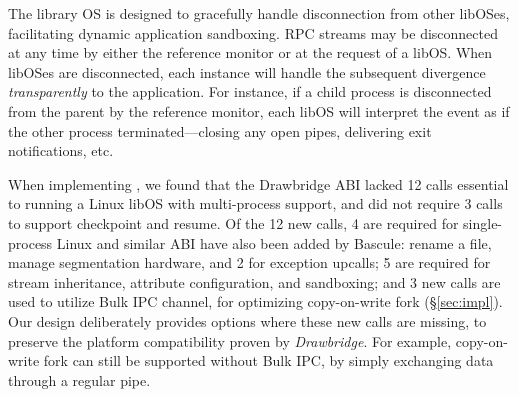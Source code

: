 The \sysname{} library OS is designed
to gracefully handle disconnection from other libOSes, 
facilitating dynamic application sandboxing.
RPC streams may be disconnected at any time by 
either the reference monitor or at the request of a libOS.
When \sysname{} libOSes are disconnected, each instance will handle the subsequent
divergence 
{\em transparently} to the application.
For instance, if a child process is disconnected from the parent by the reference monitor,
each libOS will interpret the event as if the other process terminated---closing any open pipes,
delivering exit notifications, etc.



\vspace{5pt}
 When implementing \sysname{},
we found that the Drawbridge ABI lacked 12 \pal{} calls
essential to running a Linux libOS with multi-process support, and 
\sysname{} did not require 3 \pal{} calls to support checkpoint and resume.
Of the 12 new calls, 4 are required for single-process Linux and similar ABI have also been added by Bascule:
rename a file, manage segmentation hardware, and 2 for exception upcalls;
5 are required for stream inheritance, attribute configuration, and sandboxing;
and 3 new calls are used to utilize Bulk IPC channel, for optimizing copy-on-write fork (\S\ref{sec:impl}).
Our design deliberately provides options where these new \pal{} calls are missing, to preserve the platform compatibility proven by {\em Drawbridge}. For example, copy-on-write fork can still be supported without Bulk IPC, by simply exchanging data through a regular pipe.

